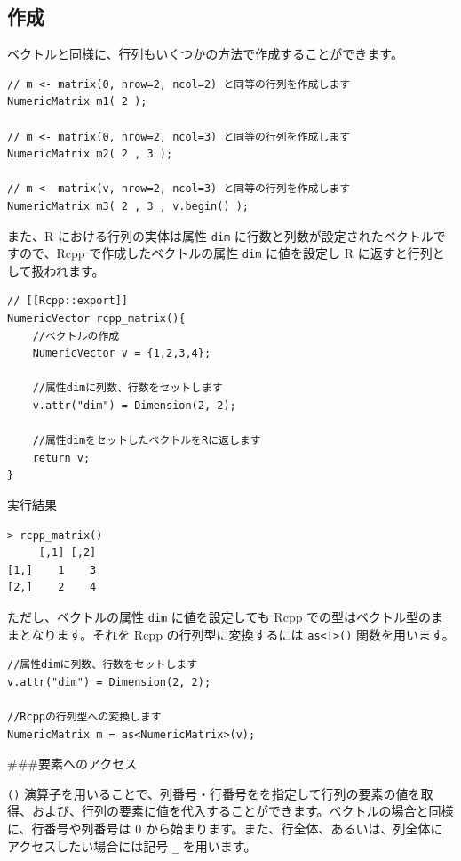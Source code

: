 \documentclass[]{book}
\begin{document}
\subsection{作成}

ベクトルと同様に、行列もいくつかの方法で作成することができます。

\begin{verbatim}
// m <- matrix(0, nrow=2, ncol=2) と同等の行列を作成します
NumericMatrix m1( 2 );

// m <- matrix(0, nrow=2, ncol=3) と同等の行列を作成します
NumericMatrix m2( 2 , 3 );

// m <- matrix(v, nrow=2, ncol=3) と同等の行列を作成します
NumericMatrix m3( 2 , 3 , v.begin() );
\end{verbatim}

また、R における行列の実体は属性 \texttt{dim} に行数と列数が設定されたベクトルですので、Rcpp で作成したベクトルの属性 \texttt{dim} に値を設定し R に返すと行列として扱われます。

\begin{verbatim}
// [[Rcpp::export]]
NumericVector rcpp_matrix(){
    //ベクトルの作成
    NumericVector v = {1,2,3,4};

    //属性dimに列数、行数をセットします
    v.attr("dim") = Dimension(2, 2);

    //属性dimをセットしたベクトルをRに返します
    return v;
}
\end{verbatim}

実行結果

\begin{verbatim}
> rcpp_matrix()
     [,1] [,2]
[1,]    1    3
[2,]    2    4
\end{verbatim}

ただし、ベクトルの属性 \texttt{dim} に値を設定しても Rcpp での型はベクトル型のままとなります。それを Rcpp の行列型に変換するには \texttt{as\textless{}T\textgreater{}()} 関数を用います。

\begin{verbatim}
//属性dimに列数、行数をセットします
v.attr("dim") = Dimension(2, 2);

//Rcppの行列型への変換します
NumericMatrix m = as<NumericMatrix>(v);
\end{verbatim}

\#\#\#要素へのアクセス

\texttt{()} 演算子を用いることで、列番号・行番号をを指定して行列の要素の値を取得、および、行列の要素に値を代入することができます。ベクトルの場合と同様に、行番号や列番号は 0 から始まります。また、行全体、あるいは、列全体にアクセスしたい場合には記号 \texttt{\_} を用います。
\end{document}
